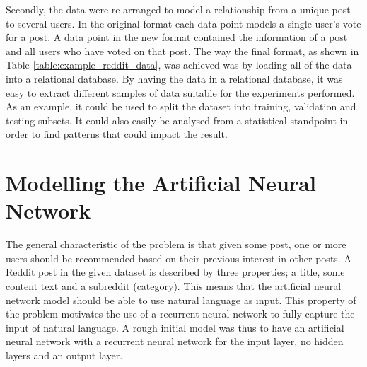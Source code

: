 Secondly, the data were re-arranged to model a relationship from a unique post to several users. In the original format each data point models a single user's vote for a post. A data point in the new format contained the information of a post and all users who have voted on that post. The way the final format, as shown in Table \ref{table:example_reddit_data}, was achieved was by loading all of the data into a relational database. By having the data in a relational database, it was easy to extract different samples of data suitable for the experiments performed. As an example, it could be used to split the dataset into training, validation and testing subsets. It could also easily be analysed from a statistical standpoint in order to find patterns that could impact the result.

\section{Modelling the Artificial Neural Network}\label{sec:modelling_the_ann}
The general characteristic of the problem is that given some post, one or more users should be recommended based on their previous interest in other posts. A Reddit post in the given dataset is described by three properties; a title, some content text and a subreddit (category). This means that the artificial neural network model should be able to use natural language as input. This property of the problem motivates the use of a recurrent neural network to fully capture the input of natural language. A rough initial model was thus to have an artificial neural network with a recurrent neural network for the input layer, no hidden layers and an output layer.

